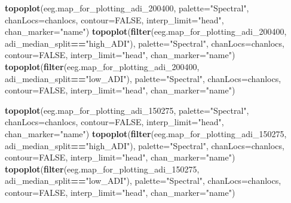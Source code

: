 \documentclass[
]{article}
\newenvironment{Shaded}{\begin{snugshade}}{\end{snugshade}}
\newcommand{\AttributeTok}[1]{\textcolor[rgb]{0.13,0.29,0.53}{#1}}
\newcommand{\ConstantTok}[1]{\textcolor[rgb]{0.56,0.35,0.01}{#1}}
\newcommand{\FunctionTok}[1]{\textcolor[rgb]{0.13,0.29,0.53}{\textbf{#1}}}
\newcommand{\NormalTok}[1]{#1}
\newcommand{\SpecialCharTok}[1]{\textcolor[rgb]{0.81,0.36,0.00}{\textbf{#1}}}
\newcommand{\StringTok}[1]{\textcolor[rgb]{0.31,0.60,0.02}{#1}}
\begin{document}
\begin{Shaded}
\begin{Highlighting}[]
\FunctionTok{topoplot}\NormalTok{(eeg.map\_for\_plotting\_adi\_200400, }\AttributeTok{palette=}\StringTok{"Spectral"}\NormalTok{, }\AttributeTok{chanLocs=}\NormalTok{chanlocs, }\AttributeTok{contour=}\ConstantTok{FALSE}\NormalTok{, }\AttributeTok{interp\_limit=}\StringTok{"head"}\NormalTok{, }\AttributeTok{chan\_marker=}\StringTok{"name"}\NormalTok{)}
\FunctionTok{topoplot}\NormalTok{(}\FunctionTok{filter}\NormalTok{(eeg.map\_for\_plotting\_adi\_200400, adi\_median\_split}\SpecialCharTok{==}\StringTok{"high\_ADI"}\NormalTok{), }\AttributeTok{palette=}\StringTok{"Spectral"}\NormalTok{, }\AttributeTok{chanLocs=}\NormalTok{chanlocs, }\AttributeTok{contour=}\ConstantTok{FALSE}\NormalTok{, }\AttributeTok{interp\_limit=}\StringTok{"head"}\NormalTok{, }\AttributeTok{chan\_marker=}\StringTok{"name"}\NormalTok{)}
\FunctionTok{topoplot}\NormalTok{(}\FunctionTok{filter}\NormalTok{(eeg.map\_for\_plotting\_adi\_200400, adi\_median\_split}\SpecialCharTok{==}\StringTok{"low\_ADI"}\NormalTok{), }\AttributeTok{palette=}\StringTok{"Spectral"}\NormalTok{, }\AttributeTok{chanLocs=}\NormalTok{chanlocs, }\AttributeTok{contour=}\ConstantTok{FALSE}\NormalTok{, }\AttributeTok{interp\_limit=}\StringTok{"head"}\NormalTok{, }\AttributeTok{chan\_marker=}\StringTok{"name"}\NormalTok{)}

\FunctionTok{topoplot}\NormalTok{(eeg.map\_for\_plotting\_adi\_150275, }\AttributeTok{palette=}\StringTok{"Spectral"}\NormalTok{, }\AttributeTok{chanLocs=}\NormalTok{chanlocs, }\AttributeTok{contour=}\ConstantTok{FALSE}\NormalTok{, }\AttributeTok{interp\_limit=}\StringTok{"head"}\NormalTok{, }\AttributeTok{chan\_marker=}\StringTok{"name"}\NormalTok{)}
\FunctionTok{topoplot}\NormalTok{(}\FunctionTok{filter}\NormalTok{(eeg.map\_for\_plotting\_adi\_150275, adi\_median\_split}\SpecialCharTok{==}\StringTok{"high\_ADI"}\NormalTok{), }\AttributeTok{palette=}\StringTok{"Spectral"}\NormalTok{, }\AttributeTok{chanLocs=}\NormalTok{chanlocs, }\AttributeTok{contour=}\ConstantTok{FALSE}\NormalTok{, }\AttributeTok{interp\_limit=}\StringTok{"head"}\NormalTok{, }\AttributeTok{chan\_marker=}\StringTok{"name"}\NormalTok{)}
\FunctionTok{topoplot}\NormalTok{(}\FunctionTok{filter}\NormalTok{(eeg.map\_for\_plotting\_adi\_150275, adi\_median\_split}\SpecialCharTok{==}\StringTok{"low\_ADI"}\NormalTok{), }\AttributeTok{palette=}\StringTok{"Spectral"}\NormalTok{, }\AttributeTok{chanLocs=}\NormalTok{chanlocs, }\AttributeTok{contour=}\ConstantTok{FALSE}\NormalTok{, }\AttributeTok{interp\_limit=}\StringTok{"head"}\NormalTok{, }\AttributeTok{chan\_marker=}\StringTok{"name"}\NormalTok{)}


\end{Highlighting}
\end{Shaded}
\end{document}
